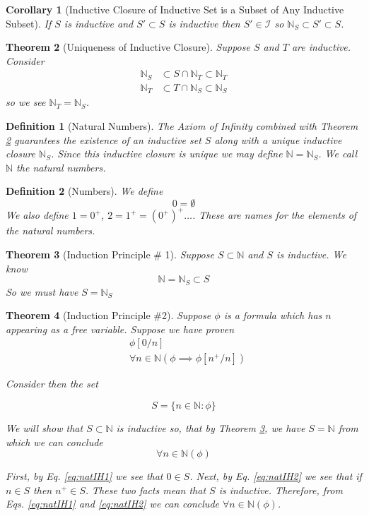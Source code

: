 \documentclass[12pt]{article}
\theoremstyle{break}
\newtheorem{definition}{Definition}[section]
\theoremstyle{break}
\newtheorem{theorem}{Theorem}[section]
\theoremstyle{break}
\newtheorem{corollary}[theorem]{Corollary}
\theoremstyle{break}
\theoremstyle{break}
\newtheorem{informal definition}[definition]{Informal Definition}
\begin{document}
\begin{corollary}[Inductive Closure of Inductive Set is a Subset of Any Inductive Subset]
If $S$ is inductive and $S' \subset S$ is inductive then $S' \in \mathcal{I}$ so $\mathbb{N}_S \subset S' \subset S$.
\end{corollary}

\begin{theorem}[Uniqueness of Inductive Closure]
\label{thm:uniqueinductiveclosure}
Suppose $S$ and $T$ are inductive.
Consider
\begin{align*}
\mathbb{N}_S &\subset S \cap \mathbb{N}_T \subset \mathbb{N}_T\\
\mathbb{N}_T &\subset T \cap \mathbb{N}_S \subset \mathbb{N}_S
\end{align*}
so we see $\mathbb{N}_T = \mathbb{N}_S$.
\end{theorem}

\begin{definition}[Natural Numbers]
The Axiom of Infinity combined with Theorem \ref{thm:uniqueinductiveclosure} guarantees the existence of an inductive set $S$ along with a unique inductive closure $\mathbb{N}_S$.
Since this inductive closure is unique we may define $\mathbb{N} = \mathbb{N}_S$.
We call $\mathbb{N}$ the natural numbers.
\end{definition}

\begin{definition}[Numbers]
We define
$$
0 = \emptyset
$$
We also define $1 = 0^+$, $2=1^+ = (0^+)^+ \ldots$.
These are names for the elements of the natural numbers.
\end{definition}

\begin{theorem}[Induction Principle \# 1]
\label{thm:indprinc1}
Suppose $S \subset \mathbb{N}$ and $S$ is inductive.
We know
$$
\mathbb{N} = \mathbb{N}_S \subset S
$$
So we must have $S = \mathbb{N}_S$
\end{theorem}

\begin{theorem}[Induction Principle \#2]
\label{thm:natindprinc2}
Suppose $\phi$ is a formula which has $n$ appearing as a free variable.
Suppose we have proven
\begin{align}
&\phi[0/n] \tag{IH1}\label{eq:natIH1}\\
&\forall n \in \mathbb{N}(\phi \implies \phi[n^+/n]) \tag{IH2}\label{eq:natIH2}
\end{align}

Consider then the set

$$
S = \{n\in \mathbb{N}: \phi\}
$$

We will show that $S\subset \mathbb{N}$ is inductive so, that by Theorem \ref{thm:indprinc1}, we have $S = \mathbb{N}$ from which we can conclude
$$
\forall n \in \mathbb{N}(\phi)
$$

First, by Eq. \ref{eq:natIH1} we see that $0\in S$.
Next, by Eq. \ref{eq:natIH2} we see that if $n\in S$ then $n^+ \in S$.
These two facts mean that $S$ is inductive.
Therefore, from Eqs. \ref{eq:natIH1} and \ref{eq:natIH2} we can conclude $\forall n \in \mathbb{N}(\phi)$.

\end{theorem}
\end{document}
